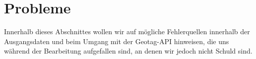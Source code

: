\section{Probleme}
 \label{sec:Probleme}
 
Innerhalb dieses Abschnittes wollen wir auf mögliche Fehlerquellen innerhalb der Ausgangsdaten und beim Umgang mit der Geotag-API hinweisen, die uns während der Bearbeitung aufgefallen sind, an denen wir jedoch nicht Schuld sind.